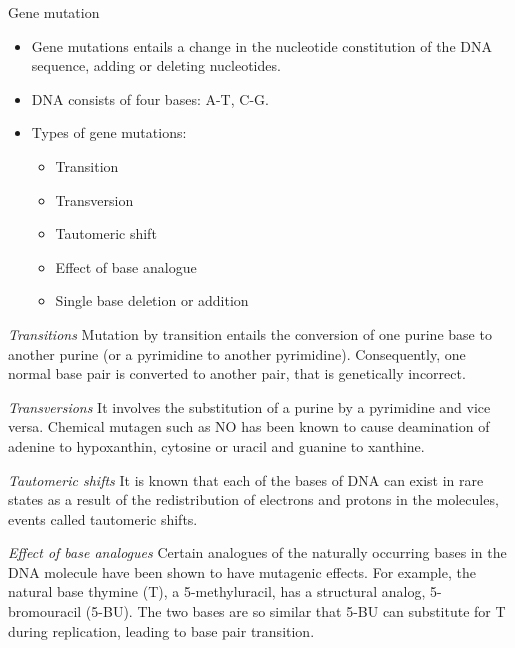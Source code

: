 \documentclass[11pt,ignorenonframetext,aspectratio=169]{beamer}
\providecommand{\tightlist}{%
  \setlength{\itemsep}{0pt}\setlength{\parskip}{0pt}}
\begin{document}
\begin{frame}{Gene mutation}
\protect\hypertarget{gene-mutation}{}
\begin{itemize}
\tightlist
\item
  Gene mutations entails a change in the nucleotide constitution of the
  DNA sequence, adding or deleting nucleotides.
\item
  DNA consists of four bases: A-T, C-G.
\item
  Types of gene mutations:

  \begin{itemize}
  \tightlist
  \item
    Transition
  \item
    Transversion
  \item
    Tautomeric shift
  \item
    Effect of base analogue
  \item
    Single base deletion or addition
  \end{itemize}
\end{itemize}
\end{frame}

\begin{frame}{}
\protect\hypertarget{section-3}{}
\emph{Transitions} Mutation by transition entails the conversion of one
purine base to another purine (or a pyrimidine to another pyrimidine).
Consequently, one normal base pair is converted to another pair, that is
genetically incorrect.

\emph{Transversions} It involves the substitution of a purine by a
pyrimidine and vice versa. Chemical mutagen such as NO has been known to
cause deamination of adenine to hypoxanthin, cytosine or uracil and
guanine to xanthine.

\emph{Tautomeric shifts} It is known that each of the bases of DNA can
exist in rare states as a result of the redistribution of electrons and
protons in the molecules, events called tautomeric shifts.

\emph{Effect of base analogues} Certain analogues of the naturally
occurring bases in the DNA molecule have been shown to have mutagenic
effects. For example, the natural base thymine (T), a 5-methyluracil,
has a structural analog, 5-bromouracil (5-BU). The two bases are so
similar that 5-BU can substitute for T during replication, leading to
base pair transition.
\end{frame}
\end{document}
